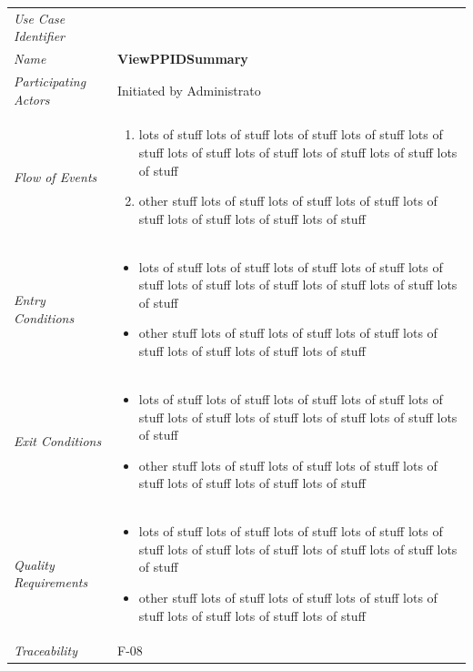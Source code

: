 \documentclass[12pt,letterpaper]{article}
\begin{document}
\begin{center}
	\begin{tabu} to 
		\toprule
		Use Case Identifier & \viewppidsummary{} \\
		Name & {\bf ViewPPIDSummary} \\
		Participating Actors & Initiated by Administrato \\
		Flow of Events & 
	    \begin{enumerate}[topsep=-1em]
		    \item lots of stuff lots of stuff lots of stuff lots of stuff lots of stuff lots of stuff lots of stuff lots of stuff lots of stuff lots of stuff
		    \item other stuff lots of stuff lots of stuff lots of stuff lots of stuff lots of stuff lots of stuff lots of stuff
		\end{enumerate} \\

		Entry Conditions &
		\begin{itemize}[topsep=-1em]
		    \item lots of stuff lots of stuff lots of stuff lots of stuff lots of stuff lots of stuff lots of stuff lots of stuff lots of stuff lots of stuff
		    \item other stuff lots of stuff lots of stuff lots of stuff lots of stuff lots of stuff lots of stuff lots of stuff
        \end{itemize} \\

		Exit Conditions &
		\begin{itemize}[topsep=-1em]
		    \item lots of stuff lots of stuff lots of stuff lots of stuff lots of stuff lots of stuff lots of stuff lots of stuff lots of stuff lots of stuff
		    \item other stuff lots of stuff lots of stuff lots of stuff lots of stuff lots of stuff lots of stuff lots of stuff
        \end{itemize} \\

		Quality Requirements &
		\begin{itemize}[topsep=-1em]
		    \item lots of stuff lots of stuff lots of stuff lots of stuff lots of stuff lots of stuff lots of stuff lots of stuff lots of stuff lots of stuff
		    \item other stuff lots of stuff lots of stuff lots of stuff lots of stuff lots of stuff lots of stuff lots of stuff
        \end{itemize} \\

		Traceability & F-08 \\
		\toprule
	\end{tabu}
\end{center}
\end{document}
